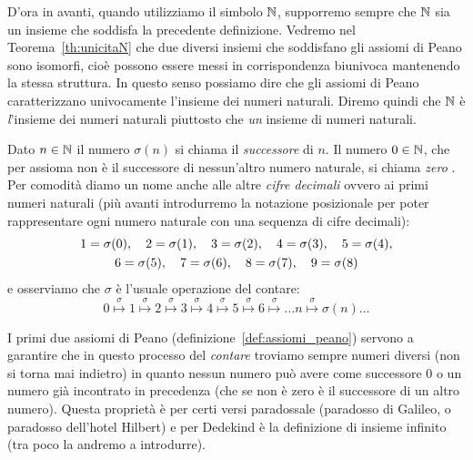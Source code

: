 D'ora in avanti, quando utilizziamo il simbolo ${\mathbb N}$, supporremo sempre che ${\mathbb N}$ sia un insieme che soddisfa la precedente definizione.
Vedremo nel Teorema~\ref{th:unicitaN} che due diversi insiemi che soddisfano gli assiomi di Peano 
sono isomorfi, cioè possono essere messi in corrispondenza biunivoca mantenendo la stessa struttura.
In questo senso possiamo dire che gli assiomi di Peano caratterizzano univocamente 
l'insieme dei numeri naturali. 
Diremo quindi che ${\mathbb N}$ è \emph{l}'insieme dei numeri naturali piuttosto 
che \emph{un} insieme di numeri naturali.

Dato $n\in {\mathbb N}$ il numero $\sigma(n)$ si chiama il \emph{successore}%
%
 di $n$. 
Il numero $0\in {\mathbb N}$, che per assioma non è il successore di nessun'altro 
numero naturale, si chiama \emph{zero}%
%
. 
Per comodità diamo un nome anche alle altre \emph{cifre decimali}
%
%
ovvero ai primi numeri naturali
(più avanti introdurremo la notazione posizionale per poter rappresentare ogni numero naturale 
con una sequenza di cifre decimali):
\begin{equation}\label{eq:cifre}
\begin{gathered}
 1 = \sigma(0),\quad  
 2 = \sigma(1),\quad
 3 = \sigma(2),\quad 
 4 = \sigma(3),\quad
 5 = \sigma(4),\\ 
 6 = \sigma(5),\quad 
 7 = \sigma(6),\quad 
 8 = \sigma(7),\quad 
 9 = \sigma(8)
\end{gathered}
\end{equation}
e osserviamo che $\sigma$ è l'usuale operazione del contare:
 \[
 0 \stackrel\sigma\mapsto 1 \stackrel\sigma\mapsto 2 \stackrel\sigma\mapsto 
 3 \stackrel\sigma\mapsto 4 \stackrel\sigma\mapsto 5 \stackrel\sigma\mapsto 
 6 \stackrel\sigma\mapsto \dots  n \stackrel\sigma\mapsto \sigma(n) \dots
 \]

I primi due assiomi di Peano (definizione~\ref{def:assiomi_peano}) 
servono a garantire che in questo processo del \emph{contare}%
%
troviamo sempre numeri diversi (non si torna mai indietro) in quanto nessun numero 
può avere come successore $0$ o un numero già incontrato in precedenza (che 
se non è zero è il successore di un altro numero).
Questa proprietà è per certi versi paradossale
(paradosso di Galileo, o paradosso dell'hotel Hilbert)
%
%
%
%
e per Dedekind è la definizione di insieme infinito (tra poco la andremo a introdurre).%
%


